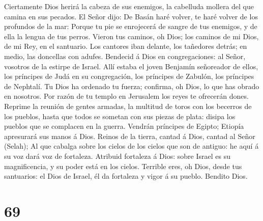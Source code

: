 Ciertamente Dios herirá la cabeza de sus enemigos, la cabelluda mollera
del que camina en sus pecados.  El Señor dijo: De Basán
haré volver, te haré volver de los profundos de la mar: 
Porque tu pie se enrojecerá de sangre de tus enemigos, y de ella la
lengua de tus perros.  Vieron tus caminos, oh Dios; los
caminos de mi Dios, de mi Rey, en el santuario.  Los
cantores iban delante, los tañedores detrás; en medio, las doncellas con
adufes.  Bendecid á Dios en congregaciones: al Señor,
vosotros de la estirpe de Israel.  Allí estaba el joven
Benjamín señoreador de ellos, los príncipes de Judá en su congregación,
los príncipes de Zabulón, los príncipes de Nephtalí.  Tu
Dios ha ordenado tu fuerza; confirma, oh Dios, lo que has obrado en
nosotros.  Por razón de tu templo en Jerusalem los reyes
te ofrecerán dones.  Reprime la reunión de gentes
armadas, la multitud de toros con los becerros de los pueblos, hasta que
todos se sometan con sus piezas de plata: disipa los pueblos que se
complacen en la guerra.  Vendrán príncipes de Egipto;
Etiopía apresurará sus manos á Dios.  Reinos de la
tierra, cantad á Dios, cantad al Señor (Selah);  Al que
cabalga sobre los cielos de los cielos que son de antiguo: he aquí á su
voz dará voz de fortaleza.  Atribuid fortaleza á Dios:
sobre Israel es su magnificencia, y su poder está en los cielos.
 Terrible eres, oh Dios, desde tus santuarios: el Dios de
Israel, él da fortaleza y vigor á su pueblo. Bendito Dios.

\hypertarget{section-68}{%
\section{69}\label{section-68}}

